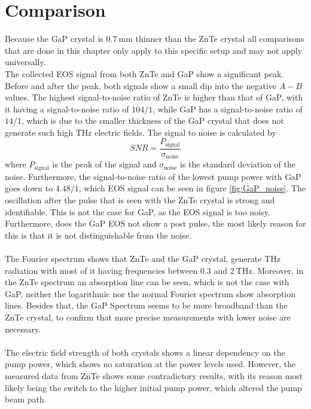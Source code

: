 \section{Comparison}
Because the GaP crystal is $\SI{0.7}{\milli\meter}$ thinner than the ZnTe crystal all comparisons that are done in this chapter only apply to this specific setup and may not apply universally.
\\
The collected EOS signal from both ZnTe and GaP show a significant peak.
Before and after the peak, both signals show a small dip into the negative $A-B$ values.
The highest signal-to-noise ratio of ZnTe is higher than that of GaP, with it having a signal-to-noise ratio of $104/1$, while GaP has a signal-to-noise ratio of $14/1$, which is due to the smaller thickness of the GaP crystal that does not generate such high $\si{\tera\hertz}$ electric fields.
The signal to noise is calculated by 
\begin{equation}
    SNR = \frac{P_\text{signal}}{\sigma_\text{noise}}
\end{equation}
where $P_\text{signal}$ is the peak of the signal and $\sigma_\text{noise}$ is the standard deviation of the noise.
Furthermore, the signal-to-noise ratio of the lowest pump power with GaP goes down to $4.48/1$, which EOS signal can be seen in figure \ref{fig:GaP_noise}.
The oscillation after the pulse that is seen with the ZnTe crystal is strong and identifiable.
This is not the case for GaP, as the EOS signal is too noisy.
Furthermore, does the GaP EOS not show a post pulse, the most likely reason for this is that it is not distinguishable from the noise.
\\\\
The Fourier spectrum shows that ZnTe and the GaP crystal, generate $\si{\tera\hertz}$ radiation with most of it having frequencies between $0.3$ and $\SI{2}{\tera\hertz}$.
Moreover, in the ZnTe spectrum an absorption line can be seen, which is not the case with GaP, neither the logarithmic nor the normal Fourier spectrum show absorption lines.
Besides that, the GaP Spectrum seems to be more broadband than the ZnTe crystal, to confirm that more precise measurements with lower noise are necessary.
\\\\
The electric field strength of both crystals shows a linear dependency on the pump power, which shows no saturation at the power levels used.
However, the measured data from ZnTe shows some contradictory results, with its reason most likely being the switch to the higher initial pump power, which altered the pump beam path.
